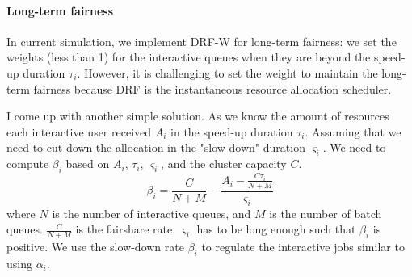 \paragraph{Long-term fairness}
In current simulation, we implement DRF-W for long-term fairness: we set the weights (less than 1) for the interactive queues when they are beyond the speed-up duration $\tau_i$. However, it is challenging to set the weight to maintain the long-term fairness because DRF is the instantaneous resource allocation scheduler.

I come up with another simple solution. As we know the amount of resources each interactive user received $A_i$ in the speed-up duration $\tau_i$. Assuming that we need to cut down the allocation in the "slow-down" duration $\varsigma_i$. We need to compute $\beta_i$ based on $A_i$, $\tau_i$, $\varsigma_i$, and the cluster capacity $C$.
$$ \beta_i = \frac{C}{N+M} - \frac{A_i-\frac{C\tau_i}{N+M}}{\varsigma_i}$$ 
where $N$ is the number of interactive queues, and $M$ is the number of batch queues. $\frac{C}{N+M}$ is the fairshare rate. $\varsigma_i$ has to be long enough such that $\beta_i$ is positive. We use the slow-down rate $\beta_i$ to regulate the interactive jobs similar to using $\alpha_i$.
